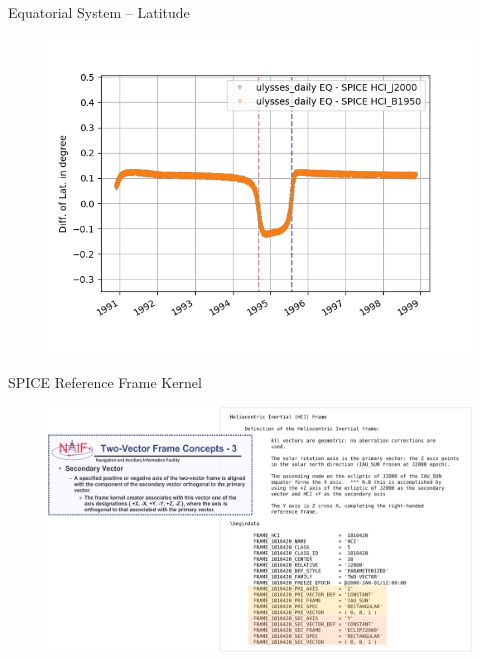 \documentclass{beamer}
\begin{document}
\begin{frame}{Equatorial System -- Latitude}
\begin{figure}									
	\includegraphics[width=1\textwidth]{Pics/EQ_LAT_J_B.png}
\end{figure}
\end{frame}

\begin{frame}{SPICE Reference Frame Kernel}
\flushleft
\begin{figure}								
	\includegraphics[width=1.1\textwidth]{Pics/kernel_instruction.png}
\end{figure}
\end{frame}

\begin{frame}{}

\end{frame}


%
%
\end{document}
